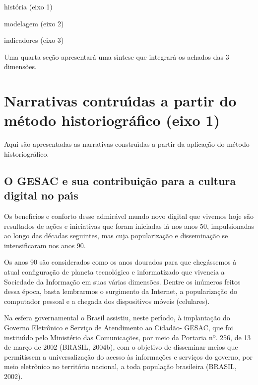 \documentclass[
12pt,		%
openright,	%
twoside,  %
a4paper,			%
chapter=TITLE,		%
english,			%
french,				%
spanish,			%
brazil				%
]{USPSC-classe/USPSC}
\begin{document}
\begin{alineas}
\item hist\'oria (eixo 1)
\item modelagem (eixo 2)
\item indicadores (eixo 3)
\end{alineas}

Uma quarta se\c{c}\~ao apresentar\'a uma s\'{\i}ntese que integrar\'a os achados das 3 dimens\~oes.




\section[Narrativas contru\'{\i}das a partir do m\'etodo historiogr\'afico (eixo 1)]{Narrativas contru\'{\i}das a partir do m\'etodo historiogr\'afico (eixo 1)}\label{Narrativas contru\'{\i}das a partir do m\'etodo historiogr\'afico (eixo 1)}
Aqui s\~ao apresentadas as narrativas constru\'{\i}das a partir da aplica\c{c}\~ao do m\'etodo historiogr\'afico.




\subsection[O GESAC e sua contribui\c{c}\~ao para  a cultura  digital  no pa\'{\i}s]{O GESAC e sua contribui\c{c}\~ao para  a cultura  digital  no pa\'{\i}s}\label{O GESAC e sua contribui\c{c}\~ao para  a cultura  digital  no pa\'{\i}s}
Os benef\'{\i}cios e conforto desse admir\'avel mundo novo digital que vivemos hoje s\~ao resultados de a\c{c}\~oes e iniciativas que foram iniciadas l\'a nos anos 50, impulsionadas ao longo das d\'ecadas seguintes, mas cuja populariza\c{c}\~ao e dissemina\c{c}\~ao se intensificaram nos anos 90.




Os anos 90 s\~ao considerados como os anos dourados para que cheg\'assemos \`a atual configura\c{c}\~ao de planeta tecnol\'ogico e informatizado que vivencia a Sociedade da Informa\c{c}\~ao em suas v\'arias dimens\~oes. Dentre os  in\'umeros feitos dessa \'epoca, basta lembrarmos o surgimento da Internet, a populariza\c{c}\~ao do computador pessoal e a chegada dos dispositivos m\'oveis (celulares).




Na esfera governamental o Brasil assistiu, neste per\'{\i}odo, \`a implanta\c{c}\~ao do Governo Eletr\^onico e Servi\c{c}o de Atendimento ao Cidad\~ao-  GESAC, que foi institu\'{\i}do pelo Minist\'erio das Comunica\c{c}\~oes, por meio  da Portaria nº. 256, de 13 de mar\c{c}o de 2002 (BRASIL, 2004b), com o objetivo de disseminar meios que permitissem a universaliza\c{c}\~ao do acesso \`as informa\c{c}\~oes e servi\c{c}os do governo, por meio eletr\^onico no territ\'orio nacional, a toda popula\c{c}\~ao brasileira (BRASIL, 2002).
\end{document}
